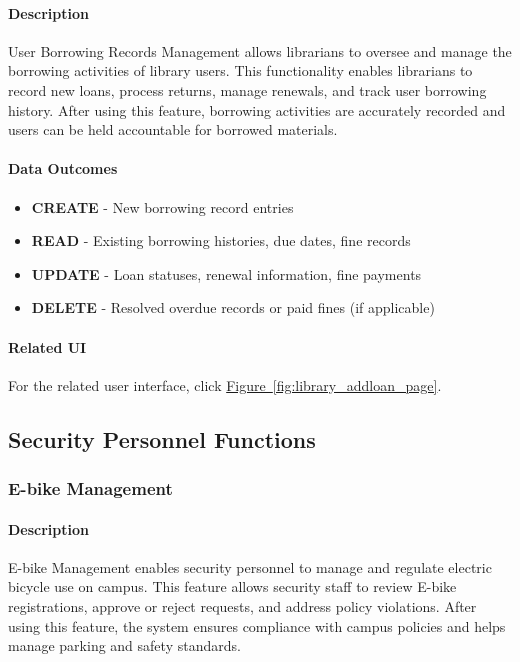 \documentclass[12pt]{article}
\begin{document}
\paragraph{Description}
User Borrowing Records Management allows librarians to oversee and manage the borrowing activities of library users. This functionality enables librarians to record new loans, process returns, manage renewals, and track user borrowing history. After using this feature, borrowing activities are accurately recorded and users can be held accountable for borrowed materials.

\paragraph{Data Outcomes}
\begin{itemize}
    \item \textbf{CREATE} - New borrowing record entries
    \item \textbf{READ} - Existing borrowing histories, due dates, fine records
    \item \textbf{UPDATE} - Loan statuses, renewal information, fine payments
    \item \textbf{DELETE} - Resolved overdue records or paid fines (if applicable)
\end{itemize}

\paragraph{Related UI}
For the related user interface, click \hyperref[fig:library_addloan_page]{Figure~\ref*{fig:library_addloan_page}}.

\subsection{Security Personnel Functions}
\subsubsection{E-bike Management}

\paragraph{Description}
E-bike Management enables security personnel to manage and regulate electric bicycle use on campus. This feature allows security staff to review E-bike registrations, approve or reject requests, and address policy violations. After using this feature, the system ensures compliance with campus policies and helps manage parking and safety standards.
\end{document}
